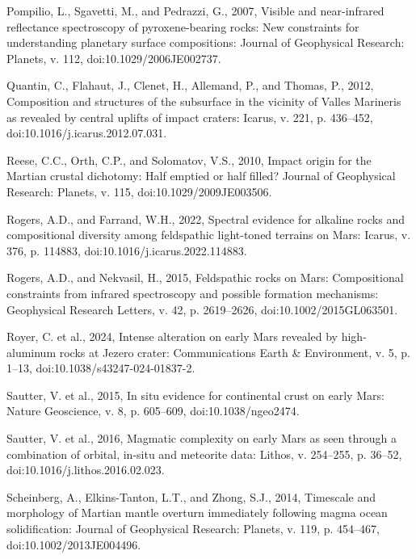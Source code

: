\documentclass[11pt]{article}
\begin{document}
\begin{thebibliography}{99}
 Pompilio, L., Sgavetti, M., and Pedrazzi, G., 2007, Visible and near-infrared reflectance spectroscopy of pyroxene-bearing rocks: New constraints for understanding planetary surface compositions: Journal of Geophysical Research: Planets, v. 112, doi:10.1029/2006JE002737.

 Quantin, C., Flahaut, J., Clenet, H., Allemand, P., and Thomas, P., 2012, Composition and structures of the subsurface in the vicinity of Valles Marineris as revealed by central uplifts of impact craters: Icarus, v. 221, p. 436--452, doi:10.1016/j.icarus.2012.07.031.

 Reese, C.C., Orth, C.P., and Solomatov, V.S., 2010, Impact origin for the Martian crustal dichotomy: Half emptied or half filled? Journal of Geophysical Research: Planets, v. 115, doi:10.1029/2009JE003506.

 Rogers, A.D., and Farrand, W.H., 2022, Spectral evidence for alkaline rocks and compositional diversity among feldspathic light-toned terrains on Mars: Icarus, v. 376, p. 114883, doi:10.1016/j.icarus.2022.114883.

 Rogers, A.D., and Nekvasil, H., 2015, Feldspathic rocks on Mars: Compositional constraints from infrared spectroscopy and possible formation mechanisms: Geophysical Research Letters, v. 42, p. 2619--2626, doi:10.1002/2015GL063501.

 Royer, C. et al., 2024, Intense alteration on early Mars revealed by high-aluminum rocks at Jezero crater: Communications Earth \& Environment, v. 5, p. 1--13, doi:10.1038/s43247-024-01837-2.

 Sautter, V. et al., 2015, In situ evidence for continental crust on early Mars: Nature Geoscience, v. 8, p. 605--609, doi:10.1038/ngeo2474.

 Sautter, V. et al., 2016, Magmatic complexity on early Mars as seen through a combination of orbital, in-situ and meteorite data: Lithos, v. 254--255, p. 36--52, doi:10.1016/j.lithos.2016.02.023.

 Scheinberg, A., Elkins-Tanton, L.T., and Zhong, S.J., 2014, Timescale and morphology of Martian mantle overturn immediately following magma ocean solidification: Journal of Geophysical Research: Planets, v. 119, p. 454--467, doi:10.1002/2013JE004496.


\end{thebibliography}
\end{document}
